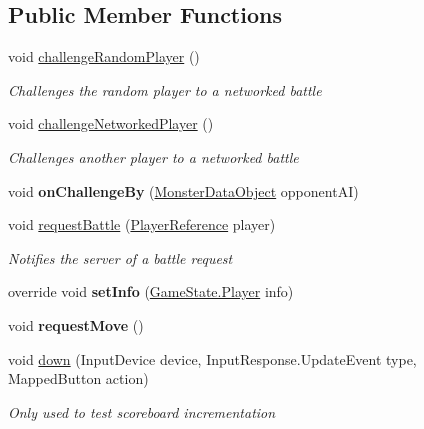 \subsection*{Public Member Functions}
\begin{DoxyCompactItemize}
\item 
void \hyperlink{class_player_local_aa5c459588b976499120386eda1c1fac0}{challenge\-Random\-Player} ()
\begin{DoxyCompactList}\small\item\em Challenges the random player to a networked battle \end{DoxyCompactList}\item 
void \hyperlink{class_player_local_a29b5e0abfc856d5aa811ad71ac220b0e}{challenge\-Networked\-Player} ()
\begin{DoxyCompactList}\small\item\em Challenges another player to a networked battle \end{DoxyCompactList}\item 
\hypertarget{class_player_local_aab51fb40e024127d177485ea82184dba}{void {\bfseries on\-Challenge\-By} (\hyperlink{class_monster_data_object}{Monster\-Data\-Object} opponent\-A\-I)}\label{class_player_local_aab51fb40e024127d177485ea82184dba}

\item 
void \hyperlink{class_player_local_a5344425e801a7f02419bf29ede2cb2af}{request\-Battle} (\hyperlink{class_player_reference}{Player\-Reference} player)
\begin{DoxyCompactList}\small\item\em Notifies the server of a battle request \end{DoxyCompactList}\item 
\hypertarget{class_player_local_a811782eb0815d88b3a1e5c8d23ee4903}{override void {\bfseries set\-Info} (\hyperlink{class_game_state_1_1_player}{Game\-State.\-Player} info)}\label{class_player_local_a811782eb0815d88b3a1e5c8d23ee4903}

\item 
\hypertarget{class_player_local_a71d5b41f860d3f8841f58a11aff1a6c3}{void {\bfseries request\-Move} ()}\label{class_player_local_a71d5b41f860d3f8841f58a11aff1a6c3}

\item 
void \hyperlink{class_player_local_ab718bcb062155f6de683dc8e78a799ba}{down} (Input\-Device device, Input\-Response.\-Update\-Event type, Mapped\-Button action)
\begin{DoxyCompactList}\small\item\em Only used to test scoreboard incrementation \end{DoxyCompactList}\end{DoxyCompactItemize}
